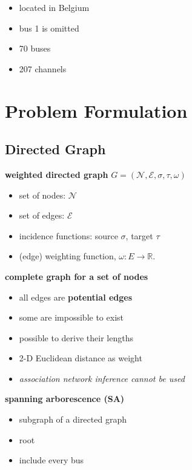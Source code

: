 \documentclass[
]{book}
\providecommand{\tightlist}{%
  \setlength{\itemsep}{0pt}\setlength{\parskip}{0pt}}
\begin{document}
\begin{itemize}
\tightlist
\item
  located in Belgium
\item
  bus 1 is omitted
\item
  70 buses
\item
  207 channels
\end{itemize}

\hypertarget{problem-formulation}{%
\chapter{Problem Formulation}\label{problem-formulation}}

\hypertarget{directed-graph}{%
\section{Directed Graph}\label{directed-graph}}

\textbf{weighted directed graph}
\(G = (\mathcal{N}, \mathcal{E}, \sigma, \tau, \omega)\)

\begin{itemize}
\tightlist
\item
  set of nodes: \(\mathcal{N}\)
\item
  set of edges: \(\mathcal{E}\)
\item
  incidence functions: source \(\sigma\), target \(\tau\)
\item
  (edge) weighting function, \(\omega: E \rightarrow \mathbb{R}\).
\end{itemize}

\textbf{complete graph for a set of nodes}

\begin{itemize}
\tightlist
\item
  all edges are \textbf{potential edges}
\item
  some are impossible to exist
\item
  possible to derive their lengths
\item
  2-D Euclidean distance as weight
\item
  \emph{association network inference cannot be used}
\end{itemize}

\textbf{spanning arborescence (SA)}

\begin{itemize}
\tightlist
\item
  subgraph of a directed graph
\item
  root
\item
  include every bus
\end{itemize}
\end{document}
